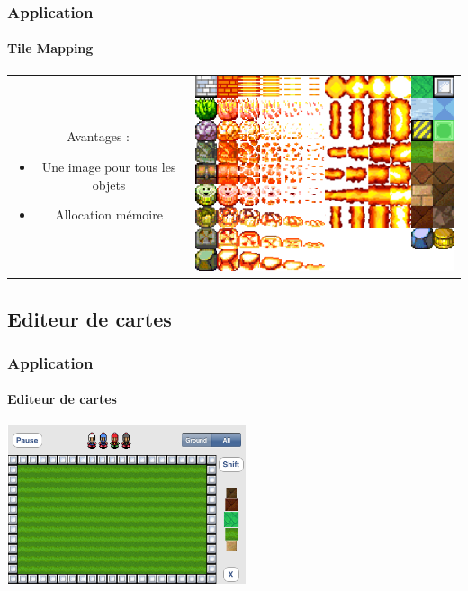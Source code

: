 	\begin{frame}
		\frametitle{Application}
		\framesubtitle{Tile Mapping}		
			
		\begin{center}
			\begin{tabular}{cc}
				\begin{minipage}{5cm}
					Avantages :
					\begin{itemize}
				 		\item Une image pour tous les objets
				 		\item Allocation mémoire
			 		\end{itemize}
				\end{minipage} &
				\begin{minipage}{8cm}
					 \includegraphics[scale=0.45]{img/objects.png}
				\end{minipage}\\
			\end{tabular}
		\end{center}
	\end{frame}
	
\subsection{Editeur de cartes}

	\begin{frame}
		\frametitle{Application}
		\framesubtitle{Editeur de cartes}
			\begin{center}
                \includegraphics[width=7cm]{./img/img1.png}
            \end{center}
		\end{frame}
	

